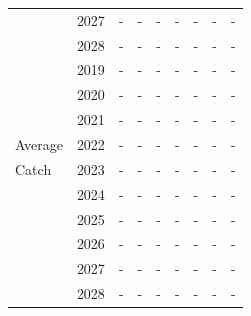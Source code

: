 \documentclass[12pt,]{article}
\begin{document}
\begin{table}[ht]
{\begin{tabular}{l|cc|>{\centering}p{.7in}c|>{\centering}p{.7in}c|>{\centering}p{.7in}c}
   & 2027 & - & - & - & - & - & - & - \\ 
   & 2028 & - & - & - & - & - & - & - \\ 
   \hline
 & 2019 & - & - & - & - & - & - & - \\ 
   & 2020 & - & - & - & - & - & - & - \\ 
   & 2021 & - & - & - & - & - & - & - \\ 
  Average & 2022 & - & - & - & - & - & - & - \\ 
  Catch & 2023 & - & - & - & - & - & - & - \\ 
   & 2024 & - & - & - & - & - & - & - \\ 
   & 2025 & - & - & - & - & - & - & - \\ 
   & 2026 & - & - & - & - & - & - & - \\ 
   & 2027 & - & - & - & - & - & - & - \\ 
   & 2028 & - & - & - & - & - & - & - \\ 
   \hline
\end{tabular}
}
\end{table}
\end{document}
